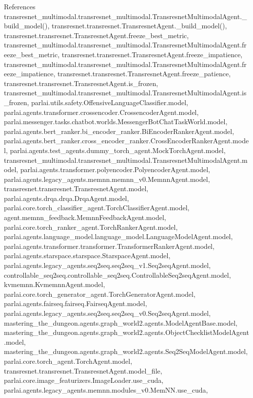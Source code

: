 References transresnet\+\_\+multimodal.\+transresnet\+\_\+multimodal.\+Transresnet\+Multimodal\+Agent.\+\_\+build\+\_\+model(), transresnet.\+transresnet.\+Transresnet\+Agent.\+\_\+build\+\_\+model(), transresnet.\+transresnet.\+Transresnet\+Agent.\+freeze\+\_\+best\+\_\+metric, transresnet\+\_\+multimodal.\+transresnet\+\_\+multimodal.\+Transresnet\+Multimodal\+Agent.\+freeze\+\_\+best\+\_\+metric, transresnet.\+transresnet.\+Transresnet\+Agent.\+freeze\+\_\+impatience, transresnet\+\_\+multimodal.\+transresnet\+\_\+multimodal.\+Transresnet\+Multimodal\+Agent.\+freeze\+\_\+impatience, transresnet.\+transresnet.\+Transresnet\+Agent.\+freeze\+\_\+patience, transresnet.\+transresnet.\+Transresnet\+Agent.\+is\+\_\+frozen, transresnet\+\_\+multimodal.\+transresnet\+\_\+multimodal.\+Transresnet\+Multimodal\+Agent.\+is\+\_\+frozen, parlai.\+utils.\+safety.\+Offensive\+Language\+Classifier.\+model, parlai.\+agents.\+transformer.\+crossencoder.\+Crossencoder\+Agent.\+model, parlai.\+messenger.\+tasks.\+chatbot.\+worlds.\+Messenger\+Bot\+Chat\+Task\+World.\+model, parlai.\+agents.\+bert\+\_\+ranker.\+bi\+\_\+encoder\+\_\+ranker.\+Bi\+Encoder\+Ranker\+Agent.\+model, parlai.\+agents.\+bert\+\_\+ranker.\+cross\+\_\+encoder\+\_\+ranker.\+Cross\+Encoder\+Ranker\+Agent.\+model, parlai.\+agents.\+test\+\_\+agents.\+dummy\+\_\+torch\+\_\+agent.\+Mock\+Torch\+Agent.\+model, transresnet\+\_\+multimodal.\+transresnet\+\_\+multimodal.\+Transresnet\+Multimodal\+Agent.\+model, parlai.\+agents.\+transformer.\+polyencoder.\+Polyencoder\+Agent.\+model, parlai.\+agents.\+legacy\+\_\+agents.\+memnn.\+memnn\+\_\+v0.\+Memnn\+Agent.\+model, transresnet.\+transresnet.\+Transresnet\+Agent.\+model, parlai.\+agents.\+drqa.\+drqa.\+Drqa\+Agent.\+model, parlai.\+core.\+torch\+\_\+classifier\+\_\+agent.\+Torch\+Classifier\+Agent.\+model, agent.\+memnn\+\_\+feedback.\+Memnn\+Feedback\+Agent.\+model, parlai.\+core.\+torch\+\_\+ranker\+\_\+agent.\+Torch\+Ranker\+Agent.\+model, parlai.\+agents.\+language\+\_\+model.\+language\+\_\+model.\+Language\+Model\+Agent.\+model, parlai.\+agents.\+transformer.\+transformer.\+Transformer\+Ranker\+Agent.\+model, parlai.\+agents.\+starspace.\+starspace.\+Starspace\+Agent.\+model, parlai.\+agents.\+legacy\+\_\+agents.\+seq2seq.\+seq2seq\+\_\+v1.\+Seq2seq\+Agent.\+model, controllable\+\_\+seq2seq.\+controllable\+\_\+seq2seq.\+Controllable\+Seq2seq\+Agent.\+model, kvmemnn.\+Kvmemnn\+Agent.\+model, parlai.\+core.\+torch\+\_\+generator\+\_\+agent.\+Torch\+Generator\+Agent.\+model, parlai.\+agents.\+fairseq.\+fairseq.\+Fairseq\+Agent.\+model, parlai.\+agents.\+legacy\+\_\+agents.\+seq2seq.\+seq2seq\+\_\+v0.\+Seq2seq\+Agent.\+model, mastering\+\_\+the\+\_\+dungeon.\+agents.\+graph\+\_\+world2.\+agents.\+Model\+Agent\+Base.\+model, mastering\+\_\+the\+\_\+dungeon.\+agents.\+graph\+\_\+world2.\+agents.\+Object\+Checklist\+Model\+Agent.\+model, mastering\+\_\+the\+\_\+dungeon.\+agents.\+graph\+\_\+world2.\+agents.\+Seq2\+Seq\+Model\+Agent.\+model, parlai.\+core.\+torch\+\_\+agent.\+Torch\+Agent.\+model, transresnet.\+transresnet.\+Transresnet\+Agent.\+model\+\_\+file, parlai.\+core.\+image\+\_\+featurizers.\+Image\+Loader.\+use\+\_\+cuda, parlai.\+agents.\+legacy\+\_\+agents.\+memnn.\+modules\+\_\+v0.\+Mem\+N\+N.\+use\+\_\+cuda, 